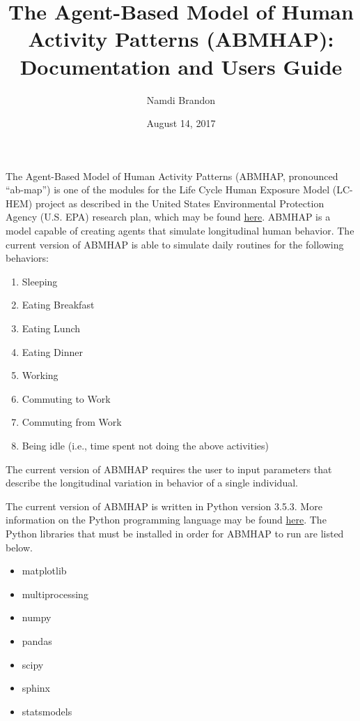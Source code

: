 \documentclass[letterpaper,10pt,english]{sphinxmanual}
\title{The Agent-Based Model of Human Activity Patterns   (ABMHAP): Documentation and Users Guide}
\date{August 14, 2017}
\author{Namdi Brandon}
\begin{document}
\maketitle
\tableofcontents
{}\label{index::doc}


The Agent-Based Model of Human Activity Patterns (ABMHAP, pronounced ``ab-map'') is one of the
modules for the Life Cycle Human Exposure Model (LC-HEM) project as described in the United States Environmental
Protection Agency (U.S. EPA) research plan, which may be found
\href{https://19january2017snapshot.epa.gov/sites/production/files/2016-11/documents/css\_fy16-19\_strap.pdf}{here}.
ABMHAP is a model capable of creating agents that simulate longitudinal human behavior. The current version of
ABMHAP is able to simulate daily routines for the following behaviors:
\begin{enumerate}
\item {} 
Sleeping

\item {} 
Eating Breakfast

\item {} 
Eating Lunch

\item {} 
Eating Dinner

\item {} 
Working

\item {} 
Commuting to Work

\item {} 
Commuting from Work

\item {} 
Being idle (i.e., time spent not doing the above activities)

\end{enumerate}

The current version of ABMHAP requires the user to input parameters that describe the longitudinal variation in behavior of a single individual.

The current version of ABMHAP is written in Python version 3.5.3. More information on the Python programming
language may be found \href{https://www.python.org/}{here}. The Python libraries that must be installed in
order for ABMHAP to run are listed below.
\begin{itemize}
\item {} 
matplotlib

\item {} 
multiprocessing

\item {} 
numpy

\item {} 
pandas

\item {} 
scipy

\item {} 
sphinx

\item {} 
statsmodels

\end{itemize}
\end{document}
